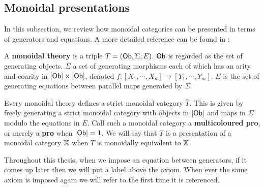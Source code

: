 \subsection{Monoidal presentations}
\label{subsec:monpres}
In this subsection, we review how monoidal categories can be presented in terms of generators and equations. A more detailed reference can be found in \cite{ih}:
\begin{definition}
\label{def:monoidaltheory}
A {\bf monoidal theory} is a triple $T=({\sf Ob},\Sigma ,E )$.   ${\sf Ob}$ is regarded as the set of generating objects. $\Sigma$ a set of generating morphisms each of which has an arity and coarity in $[{\sf Ob}]\times [{\sf Ob}]$, denoted $f:[X_1,\cdots, X_n]\to [Y_1,\cdots, Y_m]$. $E$  is the set of generating equations between parallel maps generated by $\Sigma$.

Every monoidal theory defines a strict monoidal category $\bar T$.  This is given by freely generating a strict monoidal category with objects in  $[\sf Ob]$ and  maps in $\Sigma$ modulo the equations in $E$.  Call such a monoidal category a {\bf multicoloured pro}, or merely a {\bf pro} when $|{\sf Ob}|=1$.  We will say that $T$ is a presentation of a monoidal category $\mathbb{X}$ when $\bar T$ is monoidally equivalent to $\mathbb{X}$.
\end{definition}

Throughout this thesis, when we impose an equation between generators, if it comes up later then we will put a label above the axiom.  When ever the same axiom is imposed again we will refer to the first time it is referenced.

